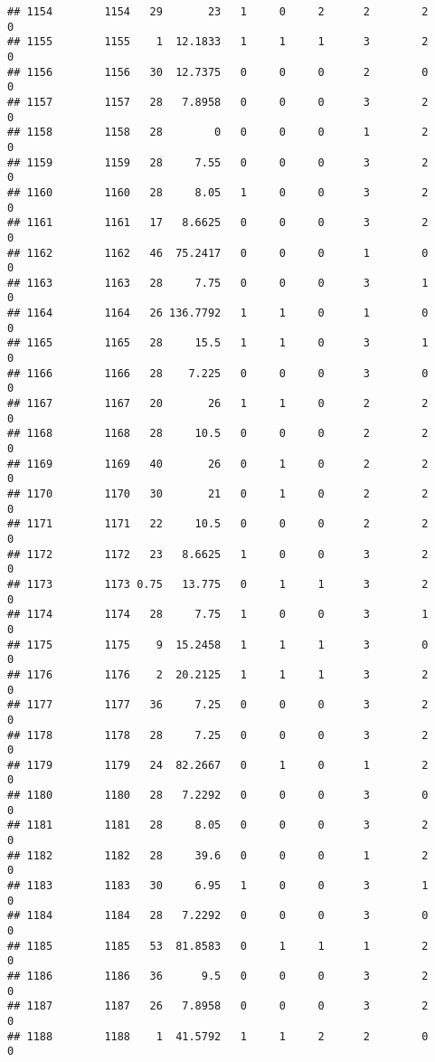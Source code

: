 \documentclass[
]{article}
\begin{document}
\begin{verbatim}
## 1154        1154   29       23   1     0     2      2        2         0
## 1155        1155    1  12.1833   1     1     1      3        2         0
## 1156        1156   30  12.7375   0     0     0      2        0         0
## 1157        1157   28   7.8958   0     0     0      3        2         0
## 1158        1158   28        0   0     0     0      1        2         0
## 1159        1159   28     7.55   0     0     0      3        2         0
## 1160        1160   28     8.05   1     0     0      3        2         0
## 1161        1161   17   8.6625   0     0     0      3        2         0
## 1162        1162   46  75.2417   0     0     0      1        0         0
## 1163        1163   28     7.75   0     0     0      3        1         0
## 1164        1164   26 136.7792   1     1     0      1        0         0
## 1165        1165   28     15.5   1     1     0      3        1         0
## 1166        1166   28    7.225   0     0     0      3        0         0
## 1167        1167   20       26   1     1     0      2        2         0
## 1168        1168   28     10.5   0     0     0      2        2         0
## 1169        1169   40       26   0     1     0      2        2         0
## 1170        1170   30       21   0     1     0      2        2         0
## 1171        1171   22     10.5   0     0     0      2        2         0
## 1172        1172   23   8.6625   1     0     0      3        2         0
## 1173        1173 0.75   13.775   0     1     1      3        2         0
## 1174        1174   28     7.75   1     0     0      3        1         0
## 1175        1175    9  15.2458   1     1     1      3        0         0
## 1176        1176    2  20.2125   1     1     1      3        2         0
## 1177        1177   36     7.25   0     0     0      3        2         0
## 1178        1178   28     7.25   0     0     0      3        2         0
## 1179        1179   24  82.2667   0     1     0      1        2         0
## 1180        1180   28   7.2292   0     0     0      3        0         0
## 1181        1181   28     8.05   0     0     0      3        2         0
## 1182        1182   28     39.6   0     0     0      1        2         0
## 1183        1183   30     6.95   1     0     0      3        1         0
## 1184        1184   28   7.2292   0     0     0      3        0         0
## 1185        1185   53  81.8583   0     1     1      1        2         0
## 1186        1186   36      9.5   0     0     0      3        2         0
## 1187        1187   26   7.8958   0     0     0      3        2         0
## 1188        1188    1  41.5792   1     1     2      2        0         0

\end{verbatim}
\end{document}
